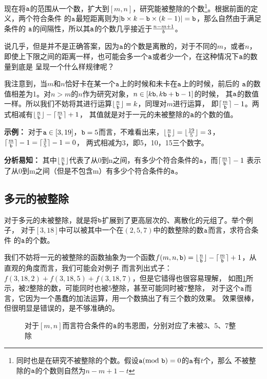 现在将$\text{\tt a}$的范围从一个数，扩大到$[m, n]$，研究能被整除的个数\footnote{%
同时也是在研究不被整除的个数。假设$\text{\tt a}(\text{mod }\text{\tt b})=0$的$\text{\tt a}$有$t$个，那么
不被整除的$\text{\tt a}$的个数则自然为$n-m+1-t$}。根据前面的定义，两个符合条件
的$\text{\tt a}$最短距离则为$|\text{\tt b}\times k-\text{\tt b}\times (k-1)|=\text{\tt b}$，那么自然由于满足条件的%
$\text{\tt a}$的间隔性，所以其$\text{\tt a}$的个数几乎接近于$n - m + 1\over b$。

说几乎，但是并不是正确答案，因为$\text{\tt a}$的个数是离散的，对于不同的$m$，或者$n$，
即使上下限之间的距离一样，也可能会多一个$\text{\tt a}$或者少一个，在这种情况下$\text{\tt a}$的数量到底是
呈现一个什么样规律呢？

我注意到，当$m$和$n$恰好卡在某一个$\text{\tt a}$上的时候和未卡在$\text{\tt a}$上的时候，前后的
$\text{\tt a}$的数值相差为1。对$n > m$的$n$作为研究对象，$n\in[k\text{\tt b}, k\text{\tt b} + \text{\tt b} - 1]$的时候，
其$\text{\tt a}$的数值一样。所以我们不妨将其进行运算$\lfloor{n\over\text{\tt b}}\rfloor=k$，同理对$m$进行运算，
即$\lceil{m\over\text{\tt b}}\rceil - 1$。两式相减有$\lfloor{n\over\text{\tt b}}\rfloor-\lceil{m\over\text{\tt b}}\rceil + 1$，
其值就是对于一元的未被整除的$\text{\tt a}$的个数的值。

{\bf 示例：}%
对于$\text{\tt a}\in[3, 19]$，$\text{\tt b}=5$而言，不难看出来，$\lfloor{n\over\text{\tt b}}\rfloor=
\lfloor{19\over 5}\rfloor=3$，$\lceil{m\over\text{\tt b}}\rceil-1=\lceil{3\over 5}\rceil-1=0$，
两式相减为$3$，即5，10，15三个数字。

{\bf 分析易知：}%
其中$\lfloor{n\over\text{\tt b}}\rfloor$代表了从0到n之间，有多少个符合条件的$\text{\tt a}$，而$\lceil{m\over\text{\tt b}}\rceil-1$%
表示了从0到m之间（但是不包含m）有多少个符合条件的$\text{\tt a}$。

\subsection{多元的被整除}

对于多元的未被整除，就是将$\text{\tt b}$扩展到了更高层次的、离散化的元组了。举个例子，
对于$[3, 18]$中可以被其中一个在$(2, 5, 7)$中的数整除的数$\text{\tt a}$而言，求符合条件
的$\text{\tt a}$的个数。

我们不妨将一元的被整除的函数抽象为一个函数$f(m, n, \text{\tt b})=
\lfloor{n\over\text{\tt b}}\rfloor-\lceil{m\over\text{\tt b}}\rceil + 1$，从直观的角度而言，我们可能会对例子
而言列出式子：$f(3, 18, 2) + f(3, 18, 5) + f(3, 18, 7)$，但是它错得也很容易理解，
如图\ref{pic:venn}所示，被2整除的数，可能同时也被5整除，甚至可能同时被7整除，
对于这个$\text{\tt a}$而言，它因为一个愚蠢的加法运算，用一个数搞出了有三个数的效果。
效果很棒，但很明显是错误的，是不够准确的。

\begin{figure}
    \centering
    \def\firstC{(0,0) circle (1.5cm)}
    \def\secondC{(60:2cm) circle (1.5cm)}
    \def\thirdC{(0:2cm) circle (1.5cm)}
    \caption{对于$[m,n]$而言符合条件的$\text{\tt a}$的韦恩图，分别对应了未被3、5、7整除}
    \label{pic:venn}
\end{figure}

